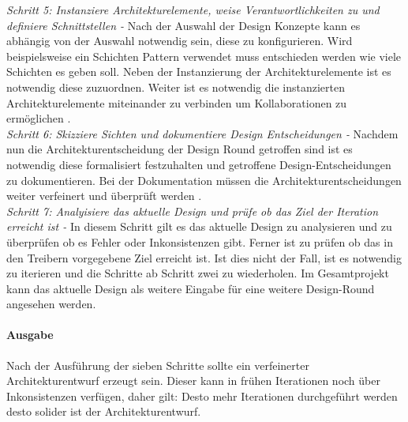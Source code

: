 \emph{Schritt 5: Instanziere Architekturelemente, weise Verantwortlichkeiten zu und definiere Schnittstellen -}
Nach der Auswahl der Design Konzepte kann es abh\"angig von der Auswahl notwendig sein, diese zu konfigurieren. Wird beispielsweise ein Schichten Pattern verwendet muss entschieden werden wie viele Schichten es geben soll. Neben der Instanzierung der Architekturelemente ist es notwendig diese zuzuordnen. Weiter ist es notwendig die instanzierten Architekturelemente miteinander zu verbinden um Kollaborationen zu erm\"oglichen \cite{Cer01}.\\

\emph{Schritt 6: Skizziere Sichten und dokumentiere Design Entscheidungen -}
Nachdem nun die Architekturentscheidung der Design Round getroffen sind ist es notwendig diese formalisiert festzuhalten und getroffene Design-Entscheidungen zu dokumentieren. Bei der Dokumentation m\"ussen die Architekturentscheidungen weiter verfeinert und \"uberpr\"uft werden \cite{Cer01}. \\

\emph{Schritt 7: Analyisiere das aktuelle Design und pr\"ufe ob das Ziel der Iteration erreicht ist -}
In diesem Schritt gilt es das aktuelle Design zu analysieren und zu \"uberpr\"ufen ob es Fehler oder Inkonsistenzen gibt. Ferner ist zu pr\"ufen ob das in den Treibern vorgegebene Ziel erreicht ist. Ist dies nicht der Fall, ist es notwendig zu iterieren und die Schritte ab Schritt zwei zu wiederholen. Im Gesamtprojekt kann das aktuelle Design als weitere Eingabe f\"ur eine weitere Design-Round angesehen werden. 

\paragraph{Ausgabe}
Nach der Ausf\"uhrung der sieben Schritte sollte ein verfeinerter Architekturentwurf erzeugt sein. Dieser kann in fr\"uhen Iterationen noch \"uber Inkonsistenzen verf\"ugen, daher gilt: Desto mehr Iterationen durchgef\"uhrt werden desto solider ist der Architekturentwurf. \\
